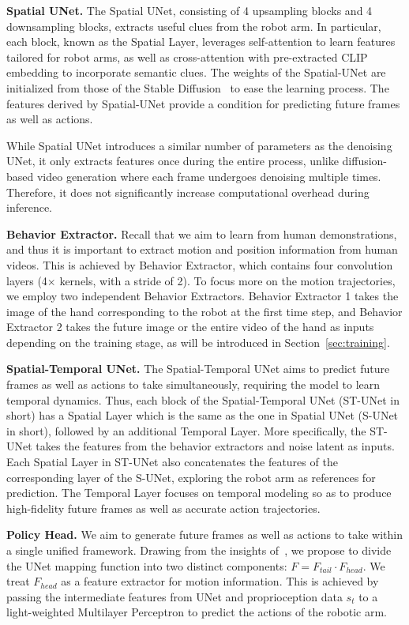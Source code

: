 \noindent\textbf{Spatial UNet.} 
The Spatial UNet, consisting of 4 upsampling blocks and 4 downsampling blocks, extracts useful clues from the robot arm. In particular, each block, known as the Spatial Layer, leverages self-attention to learn features tailored for robot arms, as well as cross-attention with pre-extracted CLIP embedding to incorporate semantic clues. The weights of the Spatial-UNet are initialized from those of the Stable Diffusion~\cite{rombach2022high} to ease the learning process. The features derived by Spatial-UNet provide a condition for predicting future frames as well as actions.

While Spatial UNet introduces a similar number of parameters as the denoising UNet, it only extracts features once during the entire process, unlike diffusion-based video generation where each frame undergoes denoising multiple times. Therefore, it does not significantly increase computational overhead during inference.

\noindent\textbf{Behavior Extractor.}
Recall that we aim to learn from human demonstrations, and thus it is important to extract motion and position information from human videos. This is achieved by Behavior Extractor, which contains four convolution layers (4$\times$ kernels, with a stride of 2). To focus more on the motion trajectories, we employ two independent Behavior Extractors. Behavior Extractor 1 takes the image of the hand corresponding to the robot at the first time step, and Behavior Extractor 2 takes the future image or the entire video of the hand as inputs depending on the training stage, as will be introduced in Section~\ref{sec:training}.



\noindent\textbf{Spatial-Temporal UNet.} 
The Spatial-Temporal UNet aims to predict future frames as well as actions to take simultaneously, requiring the model to learn temporal dynamics. Thus, each block of the Spatial-Temporal UNet (ST-UNet in short) has a Spatial Layer which is the same as the one in Spatial UNet (S-UNet in short), followed by an additional Temporal Layer. More specifically, the ST-UNet takes the features from the behavior extractors and noise latent as inputs. Each Spatial Layer in ST-UNet also concatenates the features of the corresponding layer of the S-UNet, exploring the robot arm as references for prediction. The Temporal Layer focuses on temporal modeling so as to produce high-fidelity future frames as well as accurate action trajectories.

\noindent\textbf{Policy Head.} 
We aim to generate future frames as well as actions to take within a single unified framework. Drawing from the insights of~\cite{weng2024genrec}, we propose to divide the UNet mapping function into two distinct components: \(F = F_{tail} \cdot F_{head}\). We treat \(F_{head}\) as a feature extractor for motion information. This is achieved by passing the intermediate features from UNet and proprioception data $s_t$ to a light-weighted Multilayer Perceptron to predict the actions of the robotic arm.

